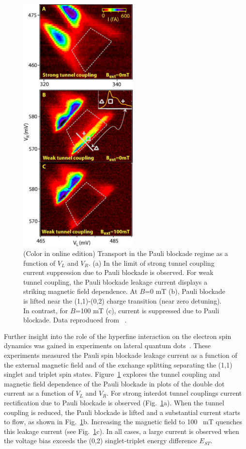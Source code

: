 \documentclass[12pt,aps,nofootinbib]{revtex4-1}
\begin{document}
\begin{figure}[htb]
\begin{center}
\includegraphics[width=6cm]{hanson_fig38.eps}
\end{center}
\caption{(Color in online edition) Transport in the Pauli blockade regime
as a function of $V_L$ and $V_R$. (a) In the limit of strong
tunnel coupling current suppression due to Pauli blockade is
observed. For weak tunnel coupling, the Pauli blockade leakage
current displays a striking magnetic field dependence. At $B$=0 mT
(b), Pauli blockade is lifted near the (1,1)-(0,2) charge
transition (near zero detuning). In contrast, for $B$=100 mT (c),
current is suppressed due to Pauli blockade. Data
reproduced from ~\textcite{koppens05}.}%
\label{Fig:KoppensLeakage}
\end{figure}

Further insight into the role of the hyperfine interaction on the
electron spin dynamics was gained in experiments on lateral
quantum dots~\cite{koppens05}. These experiments measured the
Pauli spin blockade leakage current as a function of the external
magnetic field and of the exchange splitting separating the (1,1)
singlet and triplet spin states. Figure~\ref{Fig:KoppensLeakage}
explores the tunnel coupling and magnetic field dependence of the
Pauli blockade in plots of the double dot current as a function of
$V_L$ and $V_R$. For strong interdot tunnel couplings current
rectification due to Pauli blockade is observed
(Fig.~\ref{Fig:KoppensLeakage}a). When the tunnel coupling is
reduced, the Pauli blockade is lifted and a substantial current
starts to flow, as shown in Fig.~\ref{Fig:KoppensLeakage}b.
Increasing the magnetic field to 100~ mT quenches this leakage
current (see Fig.~\ref{Fig:KoppensLeakage}c). In all cases, a
large current is observed when the voltage bias exceeds the (0,2)
singlet-triplet energy difference $E_{ST}$.
\end{document}
